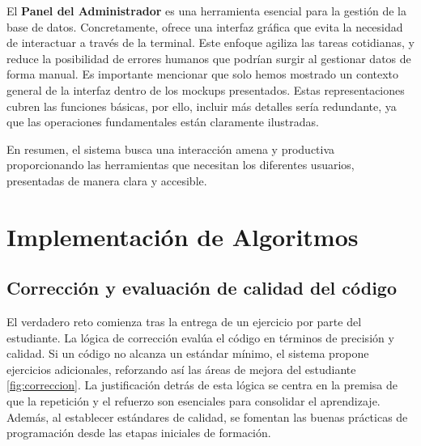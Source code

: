 El \textbf{Panel del Administrador} es una herramienta esencial para la gestión de la base de datos. Concretamente, ofrece una interfaz gráfica que evita la necesidad de interactuar a través de la terminal. Este enfoque agiliza las tareas cotidianas, y reduce la posibilidad de errores humanos que podrían surgir al gestionar datos de forma manual. Es importante mencionar que solo hemos mostrado un contexto general de la interfaz dentro de los mockups presentados. Estas representaciones cubren las funciones básicas, por ello, incluir más detalles sería redundante, ya que las operaciones fundamentales están claramente ilustradas.

En resumen, el sistema busca una interacción amena y productiva proporcionando las herramientas que necesitan los diferentes usuarios, presentadas de manera clara y accesible.

\section{Implementación de Algoritmos}

\subsection{Corrección y evaluación de calidad del código}

El verdadero reto comienza tras la entrega de un ejercicio por parte del estudiante. La lógica de corrección evalúa el código en términos de precisión y calidad. Si un código no alcanza un estándar mínimo, el sistema propone ejercicios adicionales, reforzando así las áreas de mejora del estudiante \ref{fig:correccion}. La justificación detrás de esta lógica se centra en la premisa de que la repetición y el refuerzo son esenciales para consolidar el aprendizaje. Además, al establecer estándares de calidad, se fomentan las buenas prácticas de programación desde las etapas iniciales de formación.


